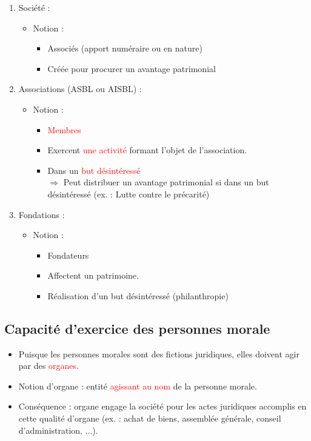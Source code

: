 \begin{enumerate}
    \item Société :
    \begin{itemize}
        \item Notion :
        \begin{itemize}
            \item Associés (apport numéraire ou en nature)
            \item Créée pour procurer un avantage patrimonial
        \end{itemize}
    \end{itemize}
    \item Associations (ASBL ou AISBL) :
    \begin{itemize}
        \item Notion :
        \begin{itemize}
            \item \textcolor{red}{Membres}
            \item Exercent \textcolor{red}{une activité} formant l'objet de l'association.
            \item Dans un \textcolor{red}{but désintéressé}\\
            $\Rightarrow$ Peut distribuer un avantage patrimonial si dans un but désintéressé (ex. : Lutte contre le précarité)
        \end{itemize}
    \end{itemize}
    \medskip
    \item Fondations :
    \begin{itemize}
        \item Notion :
        \begin{itemize}
            \item Fondateurs
            \item Affectent un patrimoine.
            \item Réalisation d'un but désintéressé (philanthropie)
        \end{itemize}
    \end{itemize}
\end{enumerate}

\subsection{Capacité d'exercice des personnes morale}

\begin{itemize}
    \item Puisque les personnes morales sont des fictions juridiques, elles doivent agir par des \textcolor{red}{organes}.
    \item Notion d'organe : entité \textcolor{red}{agissant au nom} de la personne morale.
    \item Conséquence : organe engage la société pour les actes juridiques accomplis en cette qualité d'organe (ex. :  achat de biens, assemblée générale, conseil d'administration, ...).
\end{itemize}

